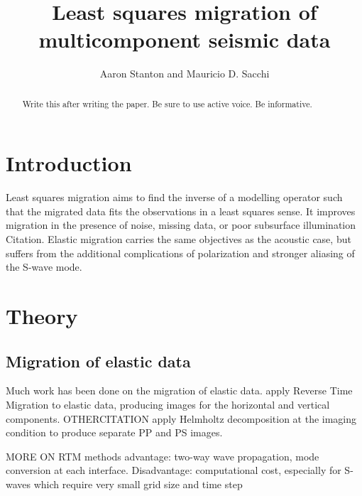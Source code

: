 
\title{Least squares migration of multicomponent seismic data}

\author{Aaron Stanton and Mauricio D. Sacchi}

\address{
University of Alberta, \\
Department of Physics, \\
4-183 CCIS, \\
Edmonton AB T6G 2E1 \\
aaron.stanton@ualberta.ca}

\footer{}

\maketitle


\begin{abstract}
  Write this after writing the paper. Be sure to use active voice. Be informative.
\end{abstract}

\section{Introduction}
Least squares migration aims to find the inverse of a modelling operator such that the migrated data fits the observations in a least squares sense. It improves migration in the presence of noise, missing data, or poor subsurface illumination Citation. Elastic migration carries the same objectives as the acoustic case, but suffers from the additional complications of polarization and stronger aliasing of the S-wave mode. 

\section{Theory}

\subsection{Migration of elastic data}
Much work has been done on the migration of elastic data. \cite{chang1987elastic} apply Reverse Time Migration to elastic data, producing images for the horizontal and vertical components. OTHERCITATION apply Helmholtz decomposition at the imaging condition to produce separate PP and PS images.

MORE ON RTM methods advantage: two-way wave propagation, mode conversion at each interface. Disadvantage: computational cost, especially for S-waves which require very small grid size and time step

